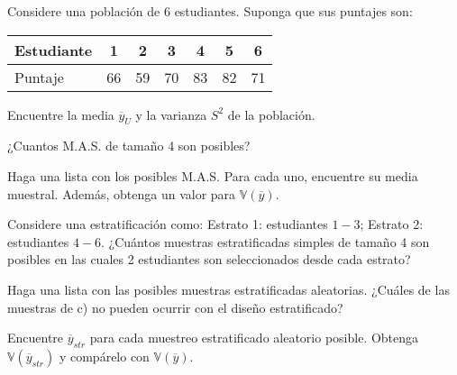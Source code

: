 \addpoints
\question Considere una población de 6 estudiantes. Suponga que sus puntajes son:
\begin{center}
\begin{tabular}{l|cccccc} 
Estudiante & 1 & 2 & 3 & 4 & 5 & 6 \\
\hline Puntaje & 66 & 59 & 70 & 83 & 82 & 71
\end{tabular}
\end{center}
\noaddpoints
\begin{parts}
\item Encuentre la media $\overline{y}_{U}$  y la varianza $S^{2}$ de la población.
\item ¿Cuantos M.A.S. de tamaño 4 son posibles?
\item Haga una lista con los posibles M.A.S. Para cada uno, encuentre su media muestral. Además, obtenga un valor para $\mathbb{V}(\overline{y})$.
\item Considere una estratificación como: Estrato 1: estudiantes $1-3$; Estrato 2: estudiantes $4-6$. ¿Cuántos muestras estratificadas simples de tamaño 4 son posibles en las cuales 2 estudiantes son seleccionados desde cada estrato?
\item Haga una lista con las posibles muestras estratificadas aleatorias. ¿Cuáles de las muestras de c) no pueden ocurrir con el diseño estratificado?
\item Encuentre $\overline{y}_{str}$ para cada muestreo estratificado aleatorio posible. Obtenga $\mathbb{V}(\overline{y}_{str})$ y compárelo con $\mathbb{V}(\overline{y})$.
\end{parts}